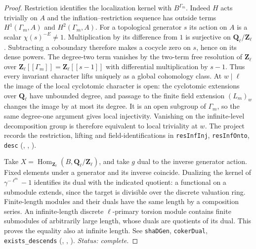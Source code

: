 \begin{proof}
Restriction identifies the localization kernel with $B^{\Gamma_m}$.
Indeed $H$ acts trivially on $A$ and the inflation--restriction sequence
has outside terms $H^1(\Gamma_m,A)$ and $H^2(\Gamma_m,A)$.
For a topological generator $s$ its action on $A$ is a scalar
$\chi(s)^{-E}\ne1$. Multiplication by its difference from $1$ is
surjective on $\mathbf Q_\ell/\mathbf Z_\ell$. Subtracting a
coboundary therefore makes a cocycle zero on $s$, hence on its dense
powers. The degree-two term vanishes by the two-term free resolution
of $\mathbf Z_\ell$ over
$\mathbf Z_\ell[[\Gamma_m]]=\mathbf Z_\ell[[s-1]]$ with differential
multiplication by $s-1$. Thus every invariant character lifts uniquely
as a global cohomology class. At $w\mid\ell$ the image of the local
cyclotomic character is open: the cyclotomic extensions over
$\mathbf Q_\ell$ have unbounded degree, and passage to the finite
field extension $(L_m)_w$ changes the image by at most its degree.
It is an open subgroup of $\Gamma_m$, so the same degree-one argument
gives local injectivity. Vanishing on the infinite-level decomposition
group is therefore equivalent to local triviality at $w$.
The project records the restriction, lifting and field-identifications in
\nolinkurl{resInfInj}, \nolinkurl{resInfOnto}, \nolinkurl{desc}
(, ,
).

Take $X=\operatorname{Hom}_{\mathbf Z_\ell}(B,\mathbf Q_\ell/\mathbf Z_\ell)$,
and take $g$ dual to the inverse generator action. Fixed elements under
a generator and its inverse coincide. Dualizing the kernel of
$\gamma^{-\ell^m}-1$ identifies its dual with the indicated quotient:
a functional on a submodule extends, since the target is divisible over
the discrete valuation ring. Finite-length modules and their duals have
the same length by a composition series. An infinite-length discrete
$\ell$-primary torsion module contains finite submodules of arbitrarily
large length, whose duals are quotients of its dual. This proves the
equality also at infinite length. See \nolinkurl{shaDGen},
\nolinkurl{cokerDual}, \nolinkurl{exists_descends}
(, ,
). \emph{Status: complete.}
\end{proof}

